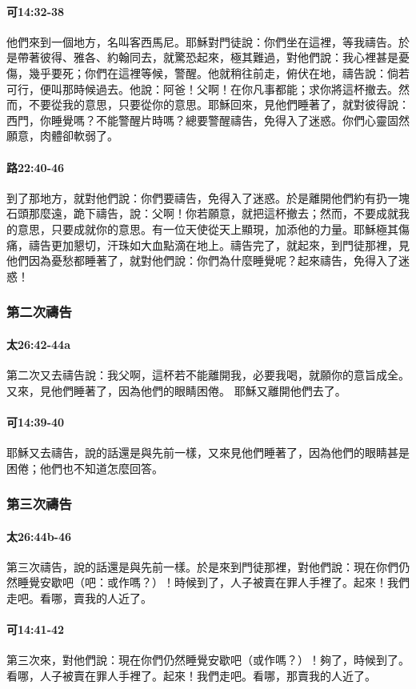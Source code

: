 \paragraph{可14:32-38}
他們來到一個地方，名叫客西馬尼。耶穌對門徒說：你們坐在這裡，等我禱告。於是帶著彼得、雅各、約翰同去，就驚恐起來，極其難過，對他們說：我心裡甚是憂傷，幾乎要死；你們在這裡等候，警醒。他就稍往前走，俯伏在地，禱告說：倘若可行，便叫那時候過去。他說：阿爸！父啊！在你凡事都能；求你將這杯撤去。然而，不要從我的意思，只要從你的意思。耶穌回來，見他們睡著了，就對彼得說：西門，你睡覺嗎？不能警醒片時嗎？總要警醒禱告，免得入了迷惑。你們心靈固然願意，肉體卻軟弱了。
\paragraph{路22:40-46}
到了那地方，就對他們說：你們要禱告，免得入了迷惑。於是離開他們約有扔一塊石頭那麼遠，跪下禱告，說：父啊！你若願意，就把這杯撤去；然而，不要成就我的意思，只要成就你的意思。有一位天使從天上顯現，加添他的力量。耶穌極其傷痛，禱告更加懇切，汗珠如大血點滴在地上。禱告完了，就起來，到門徒那裡，見他們因為憂愁都睡著了，就對他們說：你們為什麼睡覺呢？起來禱告，免得入了迷惑！
\subsubsection{第二次禱告}
\paragraph{太26:42-44a}
第二次又去禱告說：我父啊，這杯若不能離開我，必要我喝，就願你的意旨成全。又來，見他們睡著了，因為他們的眼睛困倦。
耶穌又離開他們去了。
\paragraph{可14:39-40}
耶穌又去禱告，說的話還是與先前一樣，又來見他們睡著了，因為他們的眼睛甚是困倦；他們也不知道怎麼回答。

\subsubsection{第三次禱告}
\paragraph{太26:44b-46}
第三次禱告，說的話還是與先前一樣。於是來到門徒那裡，對他們說：現在你們仍然睡覺安歇吧（吧：或作嗎？）！時候到了，人子被賣在罪人手裡了。起來！我們走吧。看哪，賣我的人近了。

\paragraph{可14:41-42}
第三次來，對他們說：現在你們仍然睡覺安歇吧（或作嗎？）！夠了，時候到了。看哪，人子被賣在罪人手裡了。起來！我們走吧。看哪，那賣我的人近了。
